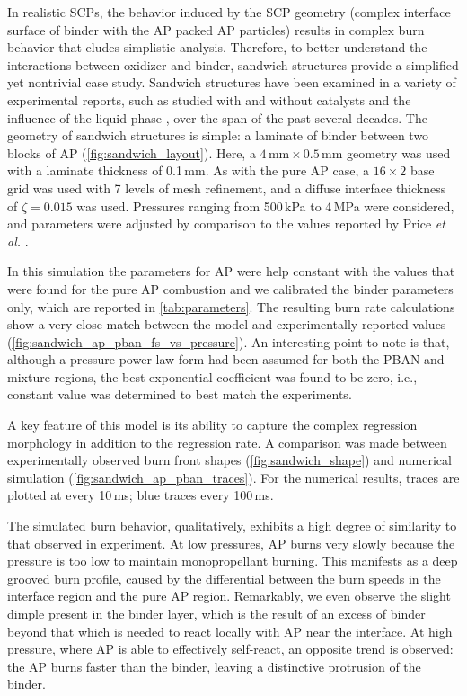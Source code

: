 \documentclass[colorinlistoftodos,review]{elsarticle}
\begin{document}
In realistic SCPs, the behavior induced by the SCP geometry (complex interface surface of binder with the AP packed AP particles) results in complex burn behavior that eludes simplistic analysis.
Therefore, to better understand the interactions between oxidizer and binder, sandwich structures provide a simplified yet nontrivial case study.
Sandwich structures have been examined in a variety of experimental reports, such as studied with and without catalysts and the influence of the liquid phase \cite{ermolaev1970laws,chorpening2002emission,chakravarthy2003plateau,chakravarthy2004intermittent, ishitha2014studies,gnanaprakash2017combustion,gnanaprakash2019effect}, over the span of the past several decades.
The geometry of sandwich structures is simple: a laminate of binder between two blocks of AP (\cref{fig:sandwich_layout}).
Here, a $4\,\mathrm{mm} \times 0.5\,\mathrm{mm}$ geometry was used with a laminate thickness of 0.1\,mm.
As with the pure AP case, a $16 \times 2$ base grid was used with 7 levels of mesh refinement, and a diffuse interface thickness of $\zeta=0.015$ was used.
Pressures ranging from 500\,kPa to 4\,MPa were considered, and parameters were adjusted by comparison to the values reported by Price {\it et al.} \cite{price1983combustion}.

In this simulation the parameters for AP were help constant with the values that were found for the pure AP combustion and we calibrated the binder parameters only, which are reported in \cref{tab:parameters}.
The resulting burn rate calculations show a very close match between the model and experimentally reported values (\cref{fig:sandwich_ap_pban_fs_vs_pressure}).
An interesting point to note is that, although a pressure power law form had been assumed for both the PBAN and mixture regions, the best exponential coefficient was found to be zero, i.e., constant value was determined to best match the experiments.

A key feature of this model is its ability to capture the complex regression morphology in addition to the regression rate.
A comparison was made between experimentally observed burn front shapes (\cref{fig:sandwich_shape}) and numerical simulation (\cref{fig:sandwich_ap_pban_traces}).
For the numerical results, traces are plotted at every 10\,ms; blue traces every 100\,ms.

The simulated burn behavior, qualitatively, exhibits a high degree of similarity to that observed in experiment.
At low pressures, AP burns very slowly because the pressure is too low to maintain monopropellant burning.
This manifests as a deep grooved burn profile, caused by the differential between the burn speeds in the interface region and the pure AP region.
Remarkably, we even observe the slight dimple present in the binder layer, which is the result of an excess of binder beyond that which is needed to react locally with AP near the interface.
At high pressure, where AP is able to effectively self-react, an opposite trend is observed: the AP burns faster than the binder, leaving a distinctive protrusion of the binder.
\end{document}
